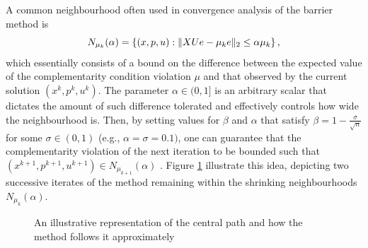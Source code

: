 A common neighbourhood often used in convergence analysis of the barrier method is
	\begin{equation*}
		N_{\mu_k}(\alpha) =  \left\{ (x, p, u) : \|X  U e - \mu_k e \|_2 \leq \alpha \mu_k \right \},
	\end{equation*} 
	which essentially consists of a bound on the difference between the expected value of the complementarity condition violation $\mu$ and that observed by the current solution $(x^k, p^k, u^k)$. The parameter $\alpha \in (0,1]$ is an arbitrary scalar that dictates the amount of such difference tolerated and effectively controls how wide the neighbourhood is. Then, by setting values for $\beta$ and $\alpha$ that satisfy $\beta = 1 - \frac{\sigma}{\sqrt{n}}$ for some $\sigma \in (0,1)$ (e.g., $\alpha = \sigma = 0.1)$, one can guarantee that the complementarity violation of the next iteration to be bounded such that $(x^{k+1}, p^{k+1}, u^{k+1}) \in N_{\mu_{k+1}}(\alpha)$ \cite{gondzio2012interior}. Figure \ref{p1c7:fig:central-path-and-neighbourhoods} illustrate this idea, depicting two successive iterates of the method remaining within the shrinking neighbourhoods $N_{\mu_k}(\alpha)$. 
	
	\begin{figure}
			\caption{An illustrative representation of the central path and how the method follows it approximately}
			\label{p1c7:fig:central-path-and-neighbourhoods} 
	\end{figure}
	
